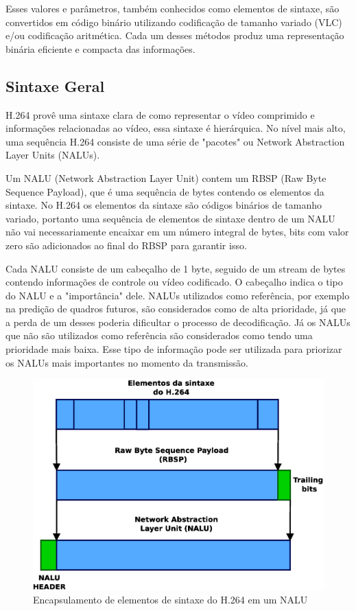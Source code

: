 Esses valores e parâmetros, também conhecidos como elementos de sintaxe, são convertidos em código binário utilizando codificação de tamanho variado (VLC) e/ou codificação aritmética. Cada um desses métodos produz uma representação binária eficiente e compacta das informações.


\subsection{Sintaxe Geral}


H.264 provê uma sintaxe clara de como representar o vídeo comprimido e informações relacionadas ao vídeo, essa sintaxe é hierárquica. No nível mais alto, uma sequência H.264 consiste de uma série de "pacotes" ou Network Abstraction Layer Units (NALUs). 

Um NALU (Network Abstraction Layer Unit) contem um RBSP (Raw Byte Sequence Payload), que é uma sequência de bytes contendo os elementos da sintaxe. No H.264 os elementos da sintaxe são códigos binários de tamanho variado, portanto uma sequência de elementos de sintaxe dentro de um NALU não vai necessariamente encaixar em um número integral de bytes, bits com valor zero são adicionados ao final do RBSP para garantir isso.

Cada NALU consiste de um cabeçalho de 1 byte, seguido de um stream de bytes contendo informações de controle ou vídeo codificado. O cabeçalho indica o tipo do NALU e a "importância" dele. NALUs utilizados como referência, por exemplo na predição de quadros futuros, são considerados como de alta prioridade, já que a perda de um desses poderia dificultar o processo de decodificação. Já os NALUs que não são utilizados como referência são considerados como tendo uma prioridade mais baixa. Esse tipo de informação pode ser utilizada para priorizar os NALUs mais importantes no momento da transmissão.


\begin{figure}[H]
\centering
\includegraphics[scale=0.4]{imagens/fig3.eps}
\caption{Encapsulamento de elementos de sintaxe do H.264 em um NALU}
\label{fig:h264_syntax}
\end{figure}



